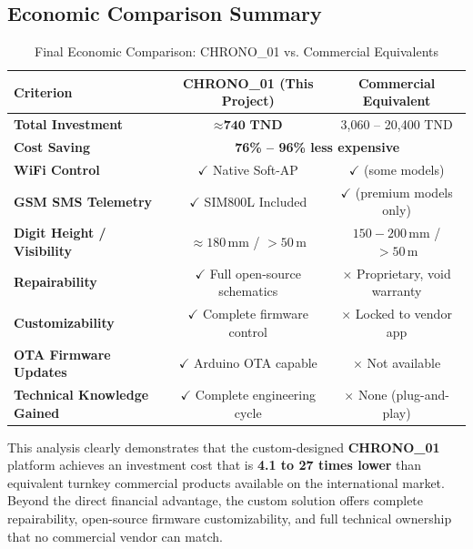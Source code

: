 \documentclass[12pt,a4paper,oneside]{report}
\begin{document}
\subsection{Economic Comparison Summary}
\begin{table}[H]
\centering
\small
\caption{Final Economic Comparison: CHRONO\_01 vs. Commercial Equivalents}
\label{tab:cost_summary}
\begin{tabular}{lcc}
\toprule
\textbf{Criterion} & \textbf{CHRONO\_01 (This Project)} & \textbf{Commercial Equivalent} \\
\midrule
\textbf{Total Investment} & $\approx \textbf{740 TND}$ & 3,060 -- 20,400 TND \\
\textbf{Cost Saving} & \multicolumn{2}{c}{\textbf{76\% -- 96\% less expensive}} \\
\textbf{WiFi Control} & $\checkmark$ Native Soft-AP & $\checkmark$ (some models) \\
\textbf{GSM SMS Telemetry} & $\checkmark$ SIM800L Included & $\checkmark$ (premium models only) \\
\textbf{Digit Height / Visibility} & $\approx 180\,\text{mm}$ / $> 50\,\text{m}$ & $150 - 200\,\text{mm}$ / $> 50\,\text{m}$ \\
\textbf{Repairability} & $\checkmark$ Full open-source schematics & $\times$ Proprietary, void warranty \\
\textbf{Customizability} & $\checkmark$ Complete firmware control & $\times$ Locked to vendor app \\
\textbf{OTA Firmware Updates} & $\checkmark$ Arduino OTA capable & $\times$ Not available \\
\textbf{Technical Knowledge Gained} & $\checkmark$ Complete engineering cycle & $\times$ None (plug-and-play) \\
\bottomrule
\end{tabular}
\end{table}

This analysis clearly demonstrates that the custom-designed \textbf{CHRONO\_01} platform achieves an investment cost that is \textbf{4.1 to 27 times lower} than equivalent turnkey commercial products available on the international market. Beyond the direct financial advantage, the custom solution offers complete repairability, open-source firmware customizability, and full technical ownership that no commercial vendor can match.
\end{document}
